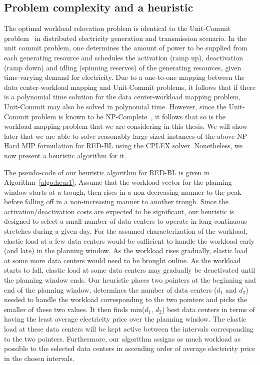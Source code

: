 \subsection{Problem complexity and a heuristic}
\label{subsec:complexityheur}The optimal workload relocation problem is identical to the Unit-Commit problem~\cite{unitcommit-trans} in distributed
electricity generation and transmission scenario. In the unit
commit problem, one determines the amount of power to be supplied from each generating resource and schedules the activation (ramp up), deactivation (ramp down) and idling (spinning reserves) of the generating resources, given time-varying demand for
electricity. Due to a one-to-one mapping between the data center-workload mapping and Unit-Commit problems, it follows that if there is a polynomial time solution for the data center-workload mapping problem, Unit-Commit may also be solved in polynomial time. However, since the Unit-Commit
problem is known to be NP-Complete~\cite{unitcommit-trans}, it follows that so is the
workload-mapping problem that we are considering in this thesis.
We will show later that we are able to solve reasonably large sized instances of the above NP-Hard MIP formulation for RED-BL using the CPLEX solver. Nonetheless, we now present a heuristic algorithm for it.

The pseudo-code of our heuristic algorithm for RED-BL is given in Algorithm~\ref{algo:heur1}. Assume that the workload vector for the planning window starts at a trough, then rises in a non-decreasing manner to the peak before falling off in a non-increasing manner to another trough. Since the activation/deactivation costs are expected to be significant, our heuristic is designed to select a small number of data centers to operate in long continuous stretches during a given day. For the assumed characterization of the workload, elastic load at a few data centers would be sufficient to handle the workload early (and late) in the planning window. As the workload rises gradually, elastic load at some more data centers would need to be brought online. As the workload starts to fall, elastic load at some data centers may gradually be deactivated until the planning window ends. Our heuristic places two pointers at the beginning and end of the planning window, determines the number of data centers ($d_1$ and $d_2$) needed to handle the workload corresponding to the two pointers and picks the smaller of these two values. It then finds min($d_1$, $d_2$) best data centers in terms of having the least average electricity price over the planning window. The elastic load at these data centers will be kept active between the intervals corresponding to the two pointers. Furthermore, our algorithm assigns as much workload as possible to the selected data centers in ascending order of average electricity price in the chosen intervals. 

